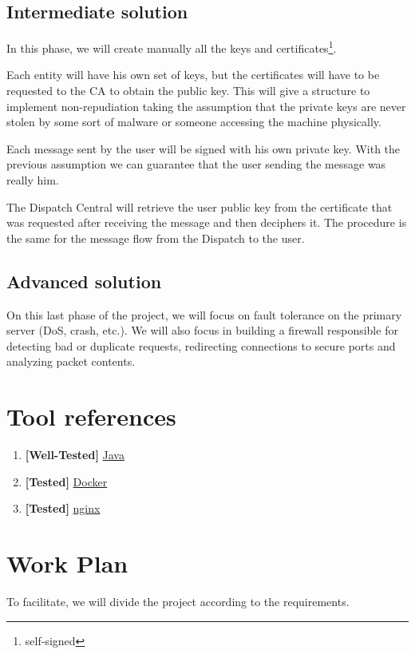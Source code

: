 \documentclass[a4paper,titlepage,11pt]{article}
\begin{document}
\subsection{Intermediate solution}
In this phase, we will create manually all the keys and certificates\footnote{self-signed}.

Each entity will have his own set of keys, but the certificates will have to be requested to the CA to obtain the public key.
This will give a structure to implement non-repudiation taking the assumption that the private keys are never stolen
by some sort of malware or someone accessing the machine physically.

Each message sent by the user will be signed with his own private key.
With the previous assumption we can guarantee that the user sending the message was really him.

The Dispatch Central will retrieve the user public key from the certificate that was requested after receiving the message and then deciphers it.
The procedure is the same for the message flow from the Dispatch to the user.

\subsection{Advanced solution}
On this last phase of the project, we will focus on fault tolerance on the primary server (DoS, crash, etc.).
We will also focus in building a firewall responsible for detecting bad or duplicate requests,
redirecting connections to secure ports and analyzing packet contents.

\section{Tool references}
\begin{enumerate}
  \item \textbf{[Well-Tested]} \href{https://www.java.com/}{Java}
  \item \textbf{[Tested]} \href{https://www.docker.com}{Docker}
  \item \textbf{[Tested]} \href{https://www.nginx.com}{nginx}
\end{enumerate}

\section{Work Plan}
To facilitate, we will divide the project according to the requirements.
\end{document}
